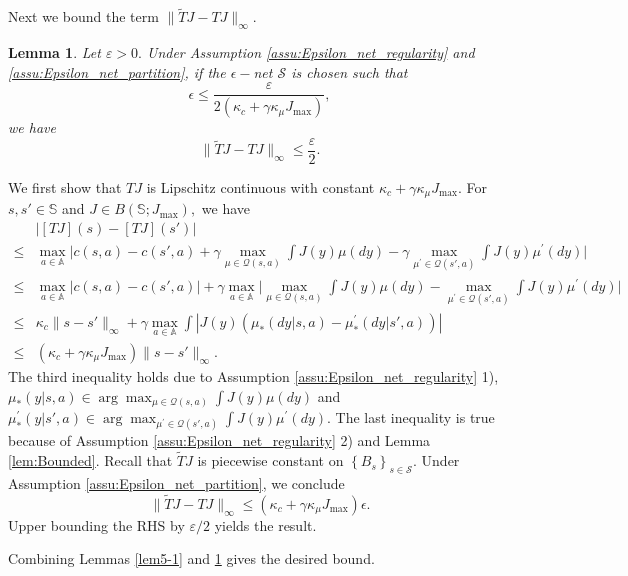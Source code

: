 \documentclass[12pt,technote,onecolumn]{IEEEtran}
\newtheorem{lemma}{Lemma}
\begin{document}
\begin{IEEEproof}
	Next we bound the term $\|\widetilde{T}J-TJ\|_{\infty}.$ 
	\begin{lemma}\label{lem5-2}
		Let $\varepsilon>0.$ Under Assumption \ref{assu:Epsilon_net_regularity} and \ref{assu:Epsilon_net_partition},
		if the $\epsilon-$net $\mathcal{S}$ is chosen such that
		\[
		\epsilon\leq\frac{\varepsilon}{2\left(\kappa_{c}+\gamma\kappa_{\mu}J_{\max}\right)},
		\]
		we have $$\|\widetilde{T}J-TJ\|_{\infty}\leq\frac{\varepsilon}{2}.$$
	\end{lemma}
	\begin{IEEEproof}
		We first show that $TJ$ is Lipschitz continuous with constant $\kappa_{c}+\gamma\kappa_{\mu}J_{\max}.$
		For $s,s'\in\mathbb{S}$ and $J\in  B\left(\mathbb{S};J_{\max}\right),$
		we have
		\begin{equation*}
		\begin{aligned}
			&   \left|\left[TJ\right]\left(s\right)-\left[TJ\right]\left(s'\right)\right|\\
			 \leq & \max_{a\in\mathbb{A}}\bigg|c(s,a)-c(s',a)+\gamma\max_{\mu\in\mathcal{Q}\left(s,a\right)}\int J\left(y\right)\mu\left(dy\right)
			 -\gamma\max_{\mu^{'}\in\mathcal{Q}\left(s',a\right)}\int J\left(y\right)\mu^{'}\left(dy\right)\bigg|\\
			 \leq & \max_{a\in\mathbb{A}}|c(s,a)-c(s',a)|
			 +\gamma\max_{a\in\mathbb{A}}\bigg|\max_{\mu\in\mathcal{Q}\left(s,a\right)}\int J\left(y\right)\mu\left(dy\right)
			 -\max_{\mu^{'}\in\mathcal{Q}\left(s',a\right)}\int J\left(y\right)\mu^{'}\left(dy\right)\bigg|\\
			 \leq & \kappa_{c}\|s-s'\|_\infty+\gamma\max_{a\in\mathbb{A}}\int|J\left(y\right)(\mu_{*}\left(dy\vert s,a\right)
			 -\mu_{*}^{'}\left(dy\vert s',a\right))|\\
			 \leq & \left(\kappa_{c}+\gamma\kappa_{\mu}J_{\max}\right)\|s-s'\|_{\infty}.
		\end{aligned}
		\end{equation*}
		The third inequality holds due to Assumption \ref{assu:Epsilon_net_regularity}
		1), $\mu_{*}\left(y\vert s,a\right)\in\arg\max_{\mu\in\mathcal{Q}\left(s,a\right)}\int J\left(y\right)\mu\left(dy\right)$
		and $\mu_{*}^{'}\left(y\vert s',a\right)\in\arg\max_{\mu^{'}\in\mathcal{Q}\left(s',a\right)}\int J\left(y\right)\mu^{'}\left(dy\right).$
		The last inequality is true because of Assumption \ref{assu:Epsilon_net_regularity}
		2) and Lemma \ref{lem:Bounded}. Recall that $\widetilde{T}J$
		is piecewise constant on $\left\{ B_{s}\right\} _{s\in\mathcal{S}}.$
		Under Assumption \ref{assu:Epsilon_net_partition}, we conclude
		\[
		\|\widetilde{T}J-TJ\|_{\infty}\leq\left(\kappa_{c}+\gamma\kappa_{\mu}J_{\max}\right)\epsilon.
		\]
		Upper bounding the RHS by $\varepsilon/2$
		yields the result. 
	\end{IEEEproof}
Combining Lemmas \ref{lem5-1} and \ref{lem5-2} gives the desired bound.
\end{IEEEproof}
\end{document}

